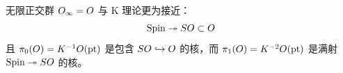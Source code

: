 \begin{enumerate}[label=\arabic*.]
无限正交群 $O_\infty = O$ 与 K 理论更为接近：
\[
  \operatorname{Spin} \twoheadrightarrow SO \subset O
\]
且 $\pi_0(O) = K^{-1}O(\mathrm{pt})$ 是包含 $SO\hookrightarrow O$ 的核，而 $\pi_1(O) = K^{-2}O(\mathrm{pt})$ 是满射 $\operatorname{Spin}\twoheadrightarrow SO$ 的核。

\end{enumerate}
